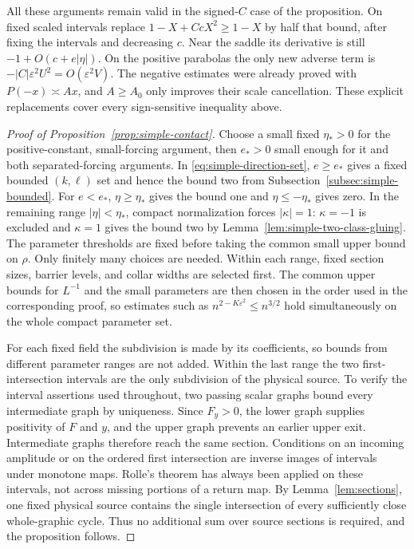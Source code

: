 All these arguments remain valid in the signed-$C$ case of the
proposition.  On fixed scaled intervals replace
$1-X+CcX^2\ge1-X$ by half that bound, after fixing the intervals and
decreasing $c$.  Near the saddle its derivative is still
$-1+O(c+e|\eta|)$.  On the positive parabolas the only new adverse
term is $-|C|\varepsilon^2U^2=O(\varepsilon^2V)$.
The negative estimates were already proved with
$P(-x)\asymp Ax$, and $A\ge A_0$ only improves their scale
cancellation.  These explicit replacements cover every sign-sensitive
inequality above.

\begin{proof}[Proof of Proposition~\ref{prop:simple-contact}]
Choose a small fixed $\eta_*>0$ for the positive-constant,
small-forcing argument, then $e_*>0$ small enough for it and both
separated-forcing arguments.
In \eqref{eq:simple-direction-set}, $e\ge e_*$ gives a fixed bounded
$(k,\ell)$ set and hence the bound two from
Subsection~\ref{subsec:simple-bounded}.
For $e<e_*$, $\eta\ge\eta_*$ gives the bound one and
$\eta\le-\eta_*$ gives zero.
In the remaining range $|\eta|<\eta_*$, compact normalization forces
$|\kappa|=1$: $\kappa=-1$ is excluded and $\kappa=1$ gives the bound
two by Lemma~\ref{lem:simple-two-class-gluing}. The parameter thresholds
are fixed before taking the common small upper bound on $\rho$.
Only finitely many choices are needed.
Within each range, fixed section sizes, barrier levels, and collar
widths are selected first.  The common upper bounds for $L^{-1}$ and
the small parameters are then chosen in the order used in the
corresponding proof, so estimates such as
$n^{2-K\varepsilon^2}\le n^{3/2}$ hold simultaneously on the whole
compact parameter set.

For each fixed field the subdivision is made by its coefficients,
so bounds from different parameter ranges are not added.  Within the
last range the two first-intersection intervals are the only
subdivision of the physical source.
To verify the interval assertions used throughout, two passing scalar
graphs bound every intermediate graph by uniqueness.  Since $F_y>0$,
the lower graph supplies positivity of $F$ and $y$, and the upper graph
prevents an earlier upper exit.  Intermediate graphs therefore reach
the same section.  Conditions on an incoming amplitude or on the
ordered first intersection are inverse images of intervals under
monotone maps.  Rolle's theorem has always been applied on these
intervals, not across missing portions of a return map.
By Lemma~\ref{lem:sections}, one fixed physical source contains the
single intersection of every sufficiently close whole-graphic cycle.
Thus no additional sum over source sections is required, and the
proposition follows.
\end{proof}

